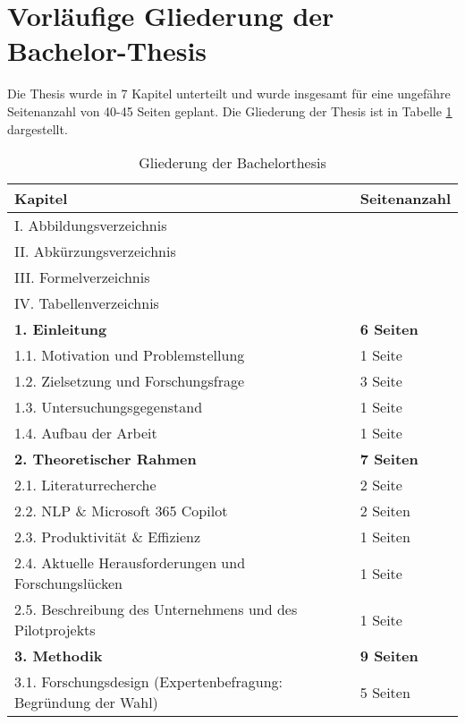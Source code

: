 
\section{Vorläufige Gliederung der Bachelor-Thesis}

Die Thesis wurde in 7 Kapitel unterteilt und wurde insgesamt für eine ungefähre Seitenanzahl von 40-45 Seiten geplant. Die Gliederung der Thesis ist in Tabelle \ref{tab:gliederung} dargestellt.

\begin{longtable}{|p{10cm}|p{2.5cm}|}
    \caption{Gliederung der Bachelorthesis} \label{tab:gliederung} \\
    \hline
    \textbf{Kapitel} & \textbf{Seitenanzahl} \\
    \hline
    I.      Abbildungsverzeichnis & \\
    \hline
    II.     Abkürzungsverzeichnis & \\
    \hline
    III.    Formelverzeichnis & \\
    \hline
    IV.     Tabellenverzeichnis & \\
    \hline
    \textbf{1. Einleitung} & \textbf{6 Seiten} \\
    \hline
        1.1. Motivation und Problemstellung & 1 Seite \\
        \hline
        1.2. Zielsetzung und Forschungsfrage & 3 Seite \\
        \hline
        1.3. Untersuchungsgegenstand & 1 Seite \\
        \hline
        1.4. Aufbau der Arbeit & 1 Seite \\
    \hline
    \textbf{2. Theoretischer Rahmen} & \textbf{7 Seiten} \\
    \hline
        2.1. Literaturrecherche & 2 Seite \\
        \hline
        2.2. NLP \& Microsoft 365 Copilot & 2 Seiten \\
        \hline
        2.3. Produktivität \& Effizienz & 1 Seiten \\
        \hline
        2.4. Aktuelle Herausforderungen und Forschungslücken & 1 Seite \\
        \hline
        2.5. Beschreibung des Unternehmens und des Pilotprojekts & 1 Seite \\
    \hline
    \textbf{3. Methodik} & \textbf{9 Seiten} \\
    \hline
        3.1. Forschungsdesign (Expertenbefragung: Begründung der Wahl) & 5 Seiten \\

\end{longtable}
